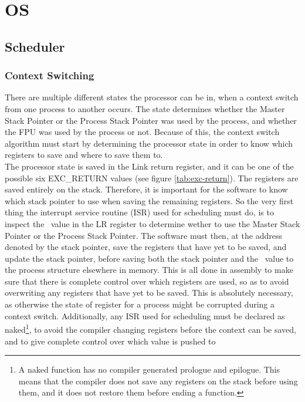 \section{OS}

\subsection{Scheduler}

\subsubsection{Context Switching}
There are multiple different states the processor can be in, when a context 
switch from one process to another occurs. The state determines whether the
Master Stack Pointer or the Process Stack Pointer was used by the process,
and whether the FPU was used by the process or not. Because of this, the context
switch algorithm must start by determining the processor state in order to know
which registers
to save and where to save them to.\\
The processor state is saved in the Link return register, and it can be one of
the possible six EXC\_RETURN values (see figure \ref{tab:exc-return}).
The registers are saved entirely on the stack. Therefore, it is important for
the software to know which
stack pointer to use when saving the remaining registers. So the very first
thing the interrupt service routine (ISR) used for scheduling must do, is to inspect
the \excreturn\ value in the LR register to determine wether to use the 
Master Stack Pointer or the Process Stack Pointer. The software must then, at 
the address denoted by the stack pointer, save the registers that have yet to be
saved, and update the stack pointer, before saving both the stack pointer and
the \excreturn\ value to the process structure elsewhere in memory. This is all
done in assembly to make sure that there is complete control over which
registers are used, so as to avoid overwriting any registers that have yet to be
saved. This is absolutely necessary, as otherwise the state of register for a
process might be corrupted during a context switch. Additionally, any ISR used
for scheduling must be declared as naked\footnote{A naked function has no
compiler generated prologue and epilogue. This means that the compiler does not
save any registers on the stack before using them, and it does not restore them
before ending a function.}, to avoid the compiler changing registers before the
context can be saved, and to give complete control over which value is pushed to
